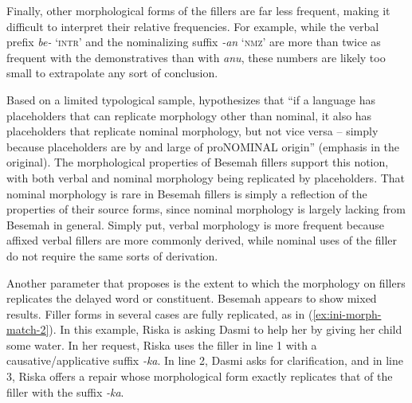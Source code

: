 \documentclass[output=paper,
\ChapterDOI{10.5281/zenodo.15697583}
colorlinks,
citecolor=brown]{langscibook}
\begin{document}
Finally, other morphological forms of the fillers are far less frequent, making it difficult to interpret their relative frequencies. For example, while the verbal prefix \textit{be-} `\textsc{intr}' and the nominalizing suffix \textit{-an} `\textsc{nmz}' are more than twice as frequent with the demonstratives than with \textit{anu}, these numbers are likely too small to extrapolate any sort of conclusion.


Based on a limited typological sample, \citet[14]{podlesskaya2010parameters} hypothesizes that ``if a language has placeholders that can replicate morphology other than nominal, it also has placeholders that replicate nominal morphology, but not vice versa – simply because placeholders are by and large of proNOMINAL origin'' (emphasis in the original). The morphological properties of Besemah fillers support this notion, with both verbal and nominal morphology being replicated by placeholders. That nominal morphology is rare in Besemah fillers is simply a reflection of the properties of their source forms, since nominal morphology is largely lacking from Besemah in general. Simply put, verbal morphology is more frequent because affixed verbal fillers are more commonly derived, while nominal uses of the filler do not require the same sorts of derivation. 

Another parameter that \citet{podlesskaya2010parameters} proposes is the extent to which the morphology on fillers replicates the delayed word or constituent. Besemah appears to show mixed results. Filler forms in several cases are fully replicated, as in (\ref{ex:ini-morph-match-2}). In this example, Riska is asking Dasmi to help her by giving her child some water. In her request, Riska uses the filler in line 1 with a causative/applicative suffix \textit{-ka}. In line 2, Dasmi asks for clarification, and in line 3, Riska offers a repair whose morphological form exactly replicates that of the filler with the suffix \textit{-ka}.
\end{document}
